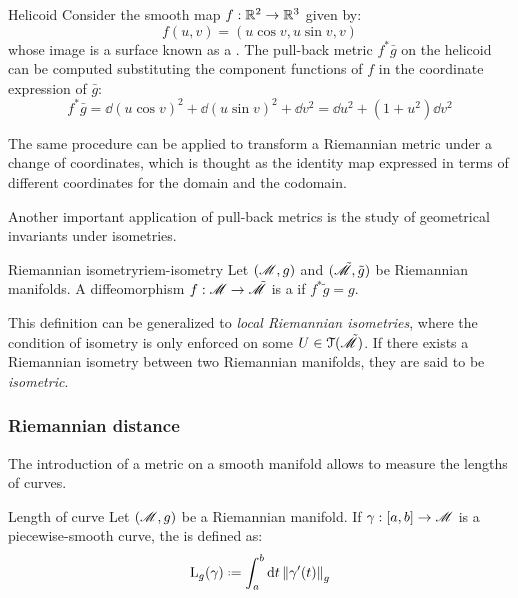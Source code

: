 \begin{example}{Helicoid}{}
  Consider the smooth map $ f : \mathbb{R}^2 \rightarrow \mathbb{R}^3 $ given by:
  \begin{equation*}
    f(u,v) = (u \cos v , u \sin v , v)
  \end{equation*}
  whose image is a surface known as a . The pull-back metric $ f^*\bar{g} $ on the helicoid can be computed substituting the component functions of $ f $ in the coordinate expression of $ \bar{g} $:
  \begin{equation*}
    f^*\bar{g} = \dd (u \cos v)^2 + \dd (u \sin v)^2 + \dd v^2 = \dd u^2 + (1 + u^2) \dd v^2
  \end{equation*}
\end{example}

The same procedure can be applied to transform a Riemannian metric under a change of coordinates, which is thought as the identity map expressed in terms of different coordinates for the domain and the codomain.

Another important application of pull-back metrics is the study of geometrical invariants under isometries.

\begin{definition}{Riemannian isometry}{riem-isometry}
  Let $ (\mathscr{M},g) $ and $ (\tilde{\mathscr{M}},\tilde{g}) $ be Riemannian manifolds. A diffeomorphism $ f : \mathscr{M} \rightarrow \tilde{\mathscr{M}} $ is a  if $ f^* \tilde{g} = g $.
\end{definition}

This definition can be generalized to \emph{local Riemannian isometries}, where the condition of isometry is only enforced on some $ U \in \EuScript{T}(\tilde{\mathscr{M}}) $. If there exists a Riemannian isometry between two Riemannian manifolds, they are said to be \emph{isometric}.

\subsubsection{Riemannian distance}

The introduction of a metric on a smooth manifold allows to measure the lengths of curves.

\begin{definition}{Length of curve}{}
  Let $ (\mathscr{M},g) $ be a Riemannian manifold. If $ \gamma : [a,b] \rightarrow \mathscr{M} $ is a piecewise-smooth curve, the  is defined as:
  \begin{equation}
    \lng_g(\gamma) \defeq \int_a^b \dd t \norm{\gamma'(t)}_g
  \end{equation}
\end{definition}

